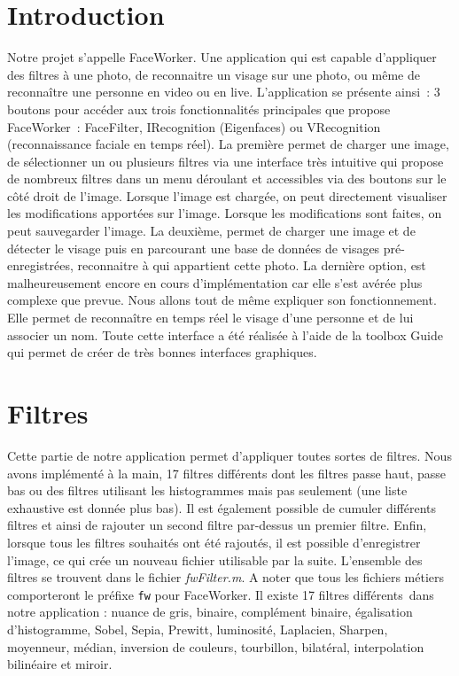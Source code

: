 \documentclass[12pt,a4paper]{article}
\begin{document}
\section{Introduction} 
Notre projet s’appelle FaceWorker. Une application qui est capable d’appliquer des filtres à une photo, de reconnaitre un visage sur une photo, ou même de reconnaître une personne en video ou en live. 
\newline
L’application se présente ainsi : 3 boutons pour accéder aux trois fonctionnalités principales que propose FaceWorker : FaceFilter, IRecognition (Eigenfaces) ou VRecognition (reconnaissance faciale en temps réel). 
\newline
La première permet de charger une image, de sélectionner un ou plusieurs filtres via une interface très intuitive qui propose de nombreux filtres dans un menu déroulant et accessibles via des boutons sur le côté droit de l’image. Lorsque l’image est chargée, on peut directement visualiser les modifications apportées sur l’image. Lorsque les modifications sont faites, on peut sauvegarder l’image.
\newline
La deuxième, permet de charger une image et de détecter le visage puis en parcourant une base de données de visages pré-enregistrées, reconnaitre à qui appartient cette photo. 
 \newline
 La dernière option, est malheureusement encore en cours d’implémentation car elle s’est avérée plus complexe que prevue. Nous allons tout de même expliquer son fonctionnement. Elle permet de reconnaître en temps réel le visage d’une personne et de lui associer un nom.
 \newline
 Toute cette interface a été réalisée à l’aide de la toolbox Guide qui permet de créer de très bonnes interfaces graphiques.
 
\section{Filtres}
Cette partie de notre application permet d’appliquer toutes sortes de filtres. Nous avons implémenté à la main, 17 filtres différents dont les filtres passe haut, passe bas ou des filtres utilisant les histogrammes mais pas seulement (une liste exhaustive est donnée plus bas). Il est également possible de cumuler différents filtres et ainsi de rajouter un second filtre par-dessus un premier filtre. Enfin, lorsque tous les filtres souhaités ont été rajoutés, il est possible d’enregistrer l’image, ce qui crée un nouveau fichier utilisable par la suite. 
\newline
L'ensemble des filtres se trouvent dans le fichier \textit{fwFilter.m}. A noter que tous les fichiers métiers comporteront le préfixe \texttt{fw} pour FaceWorker.
\newline
Il existe 17 filtres différents dans notre application : nuance de gris, binaire, complément binaire, égalisation d’histogramme, Sobel, Sepia, Prewitt, luminosité, Laplacien, Sharpen, moyenneur, médian, inversion de couleurs, tourbillon, bilatéral, interpolation bilinéaire et miroir.
\end{document}
